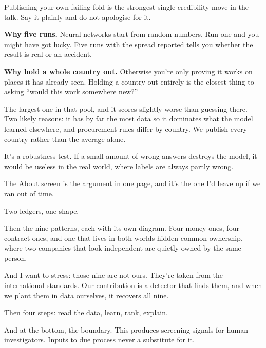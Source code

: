 \documentclass[11pt]{article}
\begin{document}
\begin{means}
Publishing your own failing fold is the strongest single credibility move in
the talk. Say it plainly and do not apologise for it.

\textbf{Why five runs.} Neural networks start from random numbers. Run one and
you might have got lucky. Five runs with the spread reported tells you whether
the result is real or an accident.

\textbf{Why hold a whole country out.} Otherwise you're only proving it works
on places it has already seen. Holding a country out entirely is the closest
thing to asking ``would this work somewhere new?''
\end{means}

\begin{asked}
 The largest one in that pool, and it scores
slightly worse than guessing there. Two likely reasons: it has by far the most
data so it dominates what the model learned elsewhere, and procurement rules
differ by country. We publish every country rather than the average alone.

 It's a robustness test. If
a small amount of wrong answers destroys the model, it would be useless in the
real world, where labels are always partly wrong.
\end{asked}



\begin{saythis}
The About screen is the argument in one page, and it's the one I'd leave up if
we ran out of time.

Two ledgers, one shape.

Then the nine patterns, each with its own diagram. Four money ones, four
contract ones, and one that lives in both worlds \bt hidden common ownership,
where two companies that look independent are quietly owned by the same person.

And I want to stress: those nine are not ours. They're taken from the
international standards. Our contribution is a detector that finds them, and
when we plant them in data ourselves, it recovers all nine.

Then four steps: read the data, learn, rank, explain.

And at the bottom, the boundary. This produces screening signals for human
investigators. Inputs to due process \bt never a substitute for it.
\end{saythis}
\end{document}

